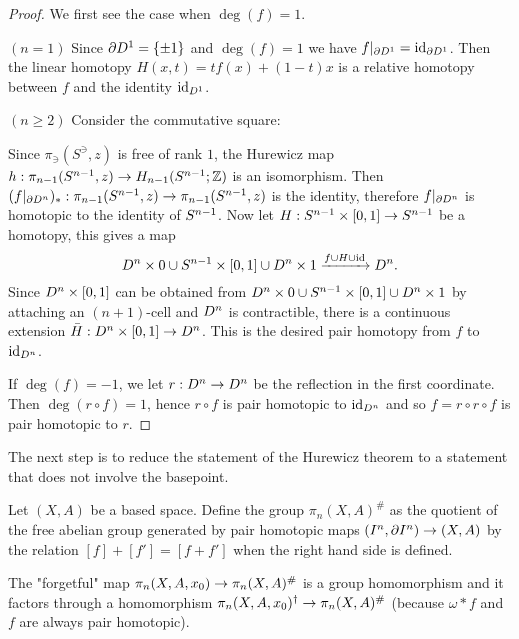 \begin{proof}
We first see the case when $\deg(f)=1$.

$(n=1)$ Since $\partial D^1=\{\pm1\}$ and $\deg(f)=1$ we have $f|_{\partial D^1}=\operatorname{id}_{\partial D^1}$. Then the linear homotopy $H(x,t)=tf(x)+(1-t)x$ is a relative homotopy between $f$ and the identity $\operatorname{id}_{D^1}$.

$(n\geq2)$ Consider the commutative square:
\begin{center}
\end{center}
Since $\pi_\ni(S^\ni,z)$ is free of rank $1$, the Hurewicz map $h:\pi_{n-1}(S^{n-1},z)\to H_{n-1}(S^{n-1};{\mathbb Z})$ is an isomorphism. Then $(f|_{\partial D^n})_*:\pi_{n-1}(S^{n-1},z)\to\pi_{n-1}(S^{n-1},z)$ is the identity, therefore $f|_{\partial D^n}$ is homotopic to the identity of $S^{n-1}$. Now let $H:S^{n-1}\times [0,1]\to S^{n-1}$ be a homotopy, this gives a map
\[D^n\times0\cup S^{n-1}\times[0,1]\cup D^n\times1\xrightarrow{f\cup H\cup\operatorname{id}}D^n.\]
Since $D^n\times[0,1]$ can be obtained from $D^n\times0\cup S^{n-1}\times[0,1]\cup D^n\times1$ by attaching an $(n+1)$-cell and $D^n$ is contractible\normalmarginpar{}, there is a continuous extension $\bar{H}:D^n\times[0,1]\to D^n$. This is the desired pair homotopy from $f$ to $\operatorname{id}_{D^n}$.

If $\deg(f)=-1$, we let $r:D^n\to D^n$ be the reflection in the first coordinate. Then $\deg(r\circ f)=1$, hence $r\circ f$ is pair homotopic to $\operatorname{id}_{D^n}$ and so $f=r\circ r\circ f$ is pair homotopic to $r$.
\end{proof}

The next step is to reduce the statement of the Hurewicz theorem to a statement that does not involve the basepoint.

Let $(X,A)$ be a based space. Define the group $\pi_n(X,A)^\#$ as the quotient of the free abelian group generated by pair homotopic maps $(I^n,\partial I^n)\to (X,A)$ by the relation $[f]+[f']=[f+f']$ when the right hand side is defined.

The "forgetful" map $\pi_n(X,A,x_0)\to\pi_n(X,A)^\#$ is a group homomorphism and it factors through a homomorphism $\pi_n(X,A,x_0)^\dagger\to\pi_n(X,A)^\#$ (because $\omega * f$ and $f$ are always pair homotopic).

